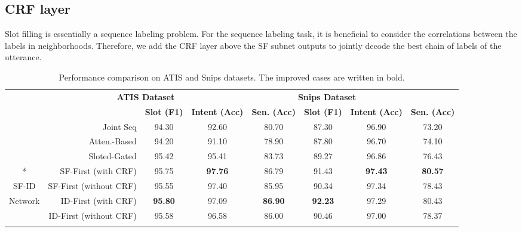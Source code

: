 \documentclass[11pt,a4paper]{article}
\begin{document}
\subsection{CRF layer}
Slot filling is essentially a sequence labeling problem. For the sequence labeling task, it is beneficial to consider the correlations between the labels in neighborhoods. Therefore, we add the CRF layer above the SF subnet outputs to jointly decode the best chain of labels of the utterance. 
\begin{table*}[ht]
		\centering
		\small
		\begin{tabular}{c|r|ccc|ccc}
			\hlineB{2}
			\multicolumn{2}{c|}{ \multirow{2}*{\textbf{Model}}}& \multicolumn{3}{c|}{\textbf{ATIS Dataset}} &\multicolumn{3}{c}{\textbf{Snips Dataset}}\\
			\cline{3-8}
			\multicolumn{2}{c|}{}&\textbf{Slot (F1)}&\textbf{Intent (Acc)}&\textbf{Sen. (Acc)}&\textbf{Slot (F1)}&\textbf{Intent (Acc)}&\textbf{Sen. (Acc)}\\
			\hline
			\multicolumn{2}{r|}{Joint Seq \cite{hakkani2016multi}}&94.30&92.60&80.70&87.30&96.90&73.20\\
			\multicolumn{2}{r|}{Atten.-Based \cite{liu2016attention}}&94.20&91.10&78.90&87.80&96.70&74.10\\
			\multicolumn{2}{r|}{Sloted-Gated \cite{goo2018slot}}&95.42&95.41&83.73&89.27&96.86&76.43\\
			\hline
			\hline
			\multicolumn{1}{c|}{ \multirow{4}*{}}&SF-First (with CRF)&95.75&\textbf{97.76}&86.79&91.43&\textbf{97.43}&\textbf{80.57}\\
			\multicolumn{1}{c|}{SF-ID}&SF-First (without CRF)&95.55&97.40&85.95&90.34&97.34&78.43\\
			\multicolumn{1}{c|}{Network}&ID-First (with CRF)&\textbf{95.80}&97.09&\textbf{86.90}&\textbf{92.23}&97.29&80.43\\
			\multicolumn{1}{c|}{}&ID-First (without CRF)&95.58&96.58&86.00&90.46&97.00&78.37\\
			\hlineB{2}
		\end{tabular}
		\caption{\label{font-table}Performance comparison on ATIS and Snips datasets. The improved cases are written in bold.  }
	\end{table*}
\end{document}
